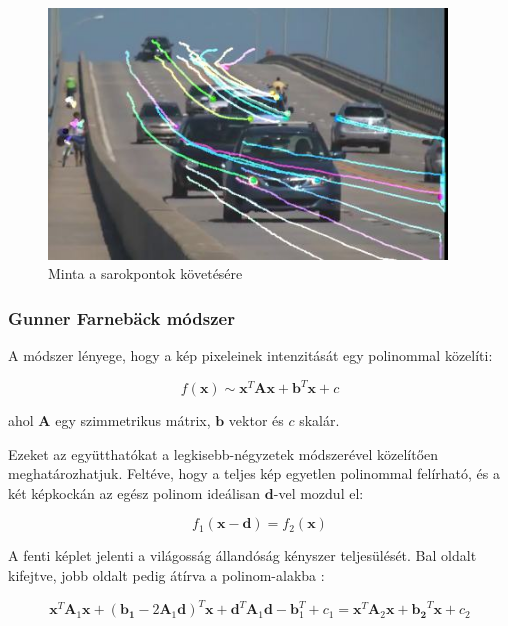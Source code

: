 
\begin{figure}[tbh]
\centering
\includegraphics[width=300pt]{figures/opticalflow_lk.jpg}
\caption{Minta a sarokpontok követésére \cite{opencv-lk} \label{fig:lk}}
\end{figure}

\subsubsection{Gunner Farnebäck módszer \cite{farneback}}

A módszer lényege, hogy a kép pixeleinek intenzitását egy polinommal közelíti:

\[f(\mathbf{x}) \sim \mathbf{x}^T \mathbf{A} \mathbf{x} + \mathbf{b}^T \mathbf{x} + c\]

ahol $\mathbf{A}$ egy szimmetrikus mátrix, $\mathbf{b}$ vektor és $c$ skalár.

Ezeket az együtthatókat a legkisebb-négyzetek módszerével közelítően meghatározhatjuk. Feltéve, hogy a teljes kép egyetlen polinommal felírható, és a két képkockán az egész polinom ideálisan $\mathbf{d}$-vel mozdul el:

\[f_1(\mathbf{x} - \mathbf{d}) = f_2(\mathbf{x})\]

A fenti képlet jelenti a világosság állandóság kényszer teljesülését. Bal oldalt kifejtve, jobb oldalt pedig átírva a polinom-alakba \cite{farneback}:

\[\mathbf{x}^T \mathbf{A}_1 \mathbf{x} + (\mathbf{b_1} - 2 \mathbf{A}_1\mathbf{d})^T \mathbf{x} + \mathbf{d}^T \mathbf{A}_1 \mathbf{d} -\mathbf{b}_1^T + c_1 = \mathbf{x}^T \mathbf{A}_2 \mathbf{x} + \mathbf{b_2}^T \mathbf{x} + c_2\]

